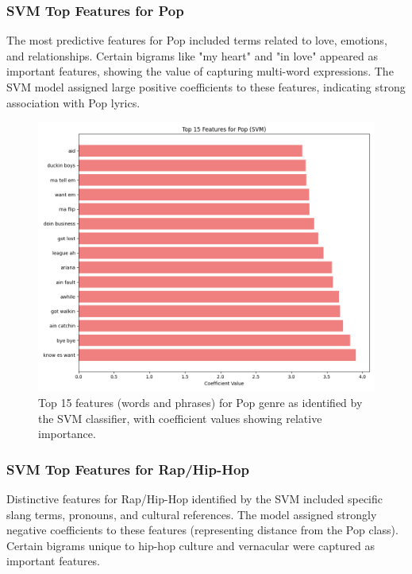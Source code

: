 \documentclass[conference]{IEEEtran}
\begin{document}
\subsubsection{SVM Top Features for Pop}
The most predictive features for Pop included terms related to love, emotions, and relationships. Certain bigrams like "my heart" and "in love" appeared as important features, showing the value of capturing multi-word expressions. The SVM model assigned large positive coefficients to these features, indicating strong association with Pop lyrics.

\begin{figure}[htbp]
\centerline{\includegraphics[width=0.9\columnwidth]{plots/svm_top_features_pop.png}}
\caption{Top 15 features (words and phrases) for Pop genre as identified by the SVM classifier, with coefficient values showing relative importance.}
\label{fig:pop_features}
\end{figure}

\subsubsection{SVM Top Features for Rap/Hip-Hop}
Distinctive features for Rap/Hip-Hop identified by the SVM included specific slang terms, pronouns, and cultural references. The model assigned strongly negative coefficients to these features (representing distance from the Pop class). Certain bigrams unique to hip-hop culture and vernacular were captured as important features.
\end{document}
